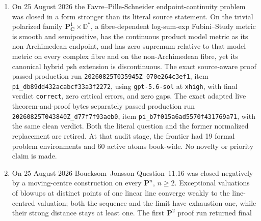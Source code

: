 \begin{enumerate}
  one-dimensional boundaryless affine tropical space locally modeled on a
  finite balanced complex with ambient-induced smooth structure, every psh
  germ is a decreasing limit of smooth psh functions on one fixed
  neighbourhood.  The curve proof includes interior-edge regularization,
  local junction Jensen inequalities, a Farkas support covector, chordal
  approximation, and a truncated regularized maximum at every vertex.  The
  exact frozen packet passed production run
  \texttt{20260825T024707Z\_d1b8d7eaf79e}, using
  \texttt{gpt-5.6-sol} at \texttt{xhigh}, with final
  \texttt{correct}, zero critical errors, and zero gaps.  The first attempt
  had two recorded proof gaps; both were repaired before the controlling
  run.  Higher-dimensional arbitrary balanced spaces, tropical boundary
  points in the curve theorem, and infinite-valence stars remain open.
\item On 25 August 2026 the Favre--Pille-Schneider endpoint-continuity
  problem was closed in a form stronger than its literal source statement.
  On the trivial polarized family
  \(\mathbf P^1_{\mathbf C}\times\mathbb D^*\), a fibre-dependent
  log-sum-exp Fubini--Study metric is smooth and semipositive, has the
  continuous product model metric as its non-Archimedean endpoint, and has
  zero supremum relative to that model metric on every complex fibre and on
  the non-Archimedean fibre, yet its canonical hybrid psh extension is
  discontinuous.  The exact source-aware proof passed production run
  \texttt{20260825T035945Z\_070e264c3ef1}, item
  \texttt{pi\_db89dd432acabcf33a3f2272}, using
  \texttt{gpt-5.6-sol} at \texttt{xhigh}, with final verdict
  \texttt{correct}, zero critical errors, and zero gaps.  The exact adapted
  live theorem-and-proof bytes separately passed production run
  \texttt{20260825T043840Z\_d77f7f93aeb0}, item
  \texttt{pi\_b7f015a6ad5570f431769a71}, with the same clean verdict.  Both the literal
  question and the former normalized replacement are retired.  At that audit
  stage, the frontier had 19 formal problem environments and 60 active atoms
  book-wide.  No novelty or priority claim is made.
\item On 25 August 2026 Boucksom--Jonsson Question~11.16 was closed
  negatively by a moving-centre construction on every \(\mathbf P^n\),
  \(n\ge2\).  Exceptional valuations of blowups at distinct points of one
  linear line converge weakly to the line-centred valuation; both the
  sequence and the limit have exhaustion one, while their strong distance
  stays at least one.  The first \(\mathbf P^2\) proof run returned final

\end{enumerate}
